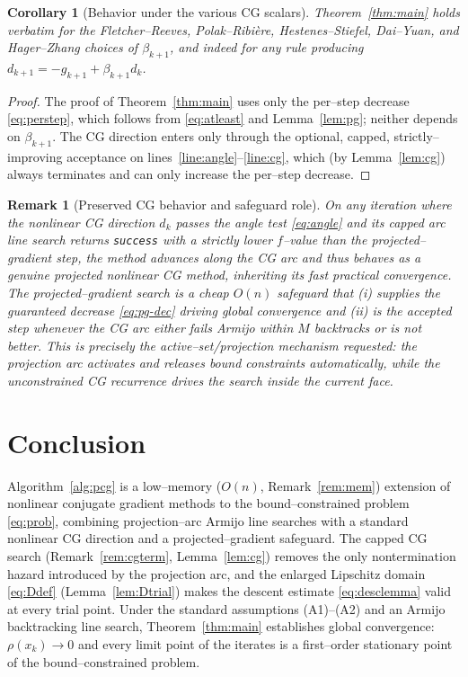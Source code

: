 \documentclass[12pt]{article}
\newtheorem{corollary}{Corollary}
\newtheorem{remark}{Remark}
\begin{document}
\begin{corollary}[Behavior under the various CG scalars]
Theorem~\ref{thm:main} holds verbatim for the Fletcher--Reeves,
Polak--Ribi\`ere, Hestenes--Stiefel, Dai--Yuan, and Hager--Zhang choices of
$\beta_{k+1}$, and indeed for any rule producing
$d_{k+1}=-g_{k+1}+\beta_{k+1}d_k$.
\end{corollary}

\begin{proof}
The proof of Theorem~\ref{thm:main} uses only the per--step decrease
\eqref{eq:perstep}, which follows from \eqref{eq:atleast} and
Lemma~\ref{lem:pg}; neither depends on $\beta_{k+1}$. The CG direction enters
only through the optional, capped, strictly--improving acceptance on
lines~\ref{line:angle}--\ref{line:cg}, which (by Lemma~\ref{lem:cg}) always
terminates and can only increase the per--step decrease.
\end{proof}

\begin{remark}[Preserved CG behavior and safeguard role]
On any iteration where the nonlinear CG direction $d_k$ passes the angle test
\eqref{eq:angle} and its capped arc line search returns \texttt{success} with a
strictly lower $f$--value than the projected--gradient step, the method advances
along the CG arc and thus behaves as a genuine projected nonlinear CG method,
inheriting its fast practical convergence. The projected--gradient search is a
cheap $O(n)$ safeguard that (i) supplies the guaranteed decrease
\eqref{eq:pg-dec} driving global convergence and (ii) is the accepted step
whenever the CG arc either fails Armijo within $M$ backtracks or is not better.
This is precisely the active--set/projection mechanism requested: the projection
arc activates and releases bound constraints automatically, while the
unconstrained CG recurrence drives the search inside the current face.
\end{remark}

\section{Conclusion}

Algorithm~\ref{alg:pcg} is a low--memory ($O(n)$, Remark~\ref{rem:mem})
extension of nonlinear conjugate gradient methods to the bound--constrained
problem \eqref{eq:prob}, combining projection--arc Armijo line searches with a
standard nonlinear CG direction and a projected--gradient safeguard. The capped
CG search (Remark~\ref{rem:cgterm}, Lemma~\ref{lem:cg}) removes the only
nontermination hazard introduced by the projection arc, and the enlarged
Lipschitz domain \eqref{eq:Ddef} (Lemma~\ref{lem:Dtrial}) makes the descent
estimate \eqref{eq:desclemma} valid at every trial point. Under the standard
assumptions (A1)--(A2) and an Armijo backtracking line search,
Theorem~\ref{thm:main} establishes global convergence: $\rho(x_k)\to0$ and every
limit point of the iterates is a first--order stationary point of the
bound--constrained problem.
\end{document}
